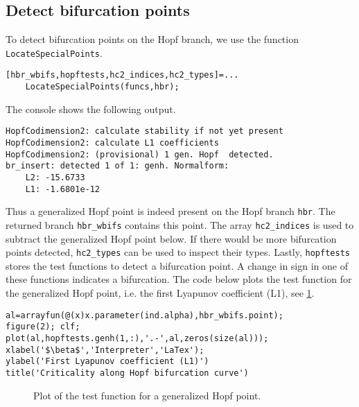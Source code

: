 \subsection{Detect bifurcation points}
To detect bifurcation points on the Hopf branch, we use the function \lstinline|LocateSpecialPoints|.
\begin{lstlisting}[style=customMatlab]
[hbr_wbifs,hopftests,hc2_indices,hc2_types]=...
    LocateSpecialPoints(funcs,hbr);
\end{lstlisting}
The \MATLAB console shows the following output.
\begin{lstlisting}[style=matlabConsole]
HopfCodimension2: calculate stability if not yet present
HopfCodimension2: calculate L1 coefficients
HopfCodimension2: (provisional) 1 gen. Hopf  detected.
br_insert: detected 1 of 1: genh. Normalform:
    L2: -15.6733
    L1: -1.6801e-12
\end{lstlisting}
Thus a generalized Hopf point is indeed present on the Hopf branch \lstinline|hbr|. The returned branch \lstinline|hbr_wbifs| contains this point. The array \lstinline{hc2_indices} is used to subtract the generalized Hopf point below. If there would be more bifurcation points detected, \lstinline|hc2_types| can be used to inspect their types. Lastly, \lstinline|hopftests| stores the test functions to detect a bifurcation point. A change in sign in one of these functions indicates a bifurcation. The code below plots the test function for the generalized Hopf point, i.e. the first Lyapunov coefficient (L1), see \cref{switch:fig:FHN_testfunction}.
\begin{lstlisting}[style=customMatlab]
al=arrayfun(@(x)x.parameter(ind.alpha),hbr_wbifs.point);
figure(2); clf;
plot(al,hopftests.genh(1,:),'.-',al,zeros(size(al)));
xlabel('$\beta$','Interpreter','LaTex');
ylabel('First Lyapunov coefficient (L1)')
title('Criticality along Hopf bifurcation curve')
\end{lstlisting}
\begin{figure}
\centering
{}
\label{switch:fig:FHN_testfunction}
\caption{Plot of the test function for a generalized Hopf point.}
\end{figure}

%


